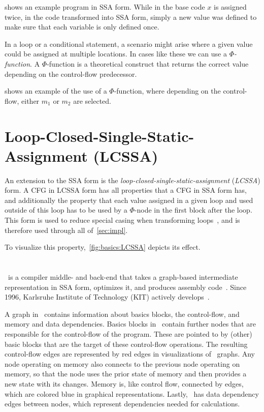  shows an example program in SSA form.
While in the base code $x$ is assigned twice, in the code transformed into SSA form, simply a new value was defined to make sure that each variable is only defined once.



In a loop or a conditional statement, a scenario might arise where a given value could be assigned at multiple locations.
In cases like these we can use a \textit{$\Phi$-function}.
A $\Phi$-function is a theoretical construct that returns the correct value depending on the control-flow predecessor.

 shows an example of the use of a $\Phi$-function, where depending on the control-flow, either $m_1$ or $m_2$  are selected.



\section{Loop-Closed-Single-Static-Assignment (LCSSA)}\label{sec:basics:LCSSA}

An extension to the SSA form is the \textit{loop-closed-single-static-assignment} (\textit{LCSSA}) form.
A CFG in LCSSA form has all properties that a CFG in SSA form has, and additionally the property that each value assigned in a given loop and used outside of this loop has to be used by a $\Phi$-node in the first block after the loop.
This form is used to reduce special casing when transforming loops~\cite{aebi18bachelorarbeit}, and is therefore used through all of~\cref{sec:impl}.

To visualize this property,~\cref{fig:basics:LCSSA} depicts its effect.



\section{\libFIRM}\label{sec:basics:firm}

\libFIRM~is a compiler middle- and back-end that takes a graph-based intermediate representation in SSA form, optimizes it, and produces assembly code~\cite{libfirm}.
Since 1996, Karlsruhe Institute of Technology (KIT) actively develops~\libFIRM.

A graph in \libFIRM~contains information about basics blocks, the control-flow, and memory and data dependencies.
Basics blocks in \libFIRM~contain further nodes that are responsible for the control-flow of the program.
These are pointed to by (other) basic blocks that are the target of these control-flow operations.
The resulting control-flow edges are represented by red edges in visualizations of \libFIRM~graphs.
Any node operating on memory also connects to the previous node operating on memory, so that the node uses the prior state of memory and then provides a new state with its changes.
Memory is, like control flow, connected by edges, which are colored blue in graphical representations.
Lastly, \libFIRM~has data dependency edges between nodes, which represent dependencies needed for calculations.

